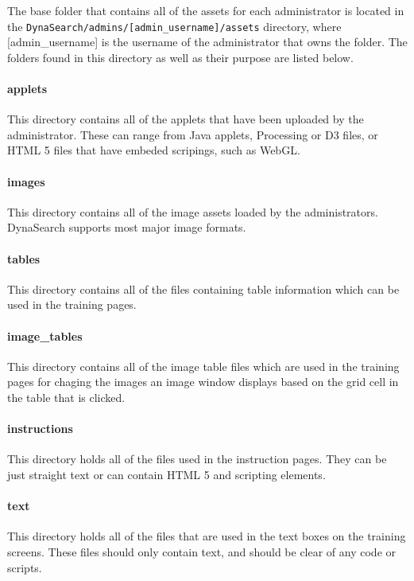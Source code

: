 \documentclass[article]{ij4uq}              %
\begin{document}
The base folder that contains all of the assets for each administrator is located in the \texttt{DynaSearch/admins/[admin\_username]/assets} directory, where [admin\_username] is the username of the administrator that owns the folder.  The folders found in this directory as well as their purpose are listed below.

\paragraph{applets}
This directory contains all of the applets that have been uploaded by the administrator.  These can range from Java applets, Processing or D3 files, or HTML 5 files that have embeded scripings, such as WebGL.

\paragraph{images}
This directory contains all of the image assets loaded by the administrators.  DynaSearch supports most major image formats.

\paragraph{tables}
This directory contains all of the files containing table information which can be used in the training pages.

\paragraph{image\_tables}
This directory contains all of the image table files which are used in the training pages for chaging the images an image window displays based on the grid cell in the table that is clicked.

\paragraph{instructions}
This directory holds all of the files used in the instruction pages.  They can be just straight text or can contain HTML 5 and scripting elements.

\paragraph{text}
This directory holds all of the files that are used in the text boxes on the training screens.  These files should only contain text, and should be clear of any code or scripts.
\end{document}
